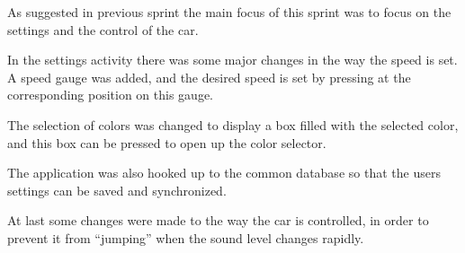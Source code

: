As suggested in previous sprint the main focus of this sprint was to focus on the settings and the control of the car.

In the settings activity there was some major changes in the way the speed is set.
A speed gauge was added, and the desired speed is set by pressing at the corresponding position on this gauge.

The selection of colors was changed to display a box filled with the selected color, and this box can be pressed to open up the color selector.

The application was also hooked up to the common database so that the users settings can be saved and synchronized.

At last some changes were made to the way the car is controlled, in order to prevent it from ``jumping'' when the sound level changes rapidly.